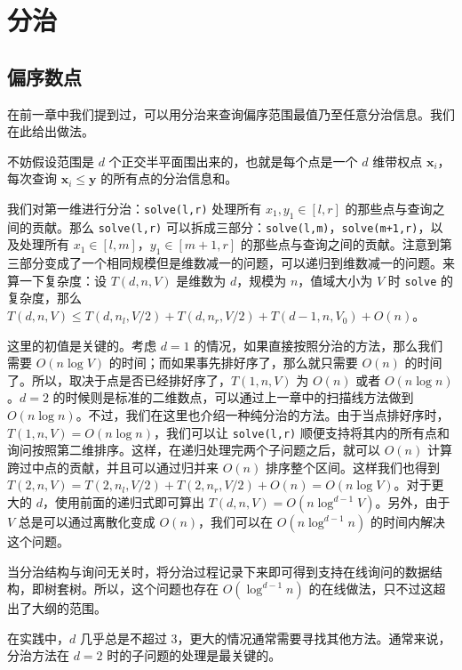 \chapter{分治}

\section{偏序数点}

在前一章中我们提到过，可以用分治来查询偏序范围最值乃至任意分治信息。我们在此给出做法。

不妨假设范围是 $d$ 个正交半平面围出来的，也就是每个点是一个 $d$ 维带权点 $\mathbf x_i$，每次查询 $\mathbf x_i\le \mathbf y$ 的所有点的分治信息和。

我们对第一维进行分治：\texttt{solve(l,r)} 处理所有 $x_1,y_1\in[l,r]$ 的那些点与查询之间的贡献。那么 \texttt{solve(l,r)} 可以拆成三部分：\texttt{solve(l,m)}，\texttt{solve(m+1,r)}，以及处理所有 $x_1\in [l,m]$，$y_1\in [m+1,r]$ 的那些点与查询之间的贡献。注意到第三部分变成了一个相同规模但是维数减一的问题，可以递归到维数减一的问题。来算一下复杂度：设 $T(d,n,V)$ 是维数为 $d$，规模为 $n$，值域大小为 $V$ 时 \texttt{solve} 的复杂度，那么 $T(d,n,V)\le T(d,n_l,V/2)+T(d,n_r,V/2)+T(d-1,n,V_0)+O(n)$。

这里的初值是关键的。考虑 $d=1$ 的情况，如果直接按照分治的方法，那么我们需要 $O(n\log V)$ 的时间；而如果事先排好序了，那么就只需要 $O(n)$ 的时间了。所以，取决于点是否已经排好序了，$T(1,n,V)$ 为 $O(n)$ 或者 $O(n\log n)$。$d=2$ 的时候则是标准的二维数点，可以通过上一章中的扫描线方法做到 $O(n\log n)$。不过，我们在这里也介绍一种纯分治的方法。由于当点排好序时，$T(1,n,V)=O(n\log n)$，我们可以让 \texttt{solve(l,r)} 顺便支持将其内的所有点和询问按照第二维排序。这样，在递归处理完两个子问题之后，就可以 $O(n)$ 计算跨过中点的贡献，并且可以通过归并来 $O(n)$ 排序整个区间。这样我们也得到 $T(2,n,V)=T(2,n_l,V/2)+T(2,n_r,V/2)+O(n)=O(n\log V)$。对于更大的 $d$，使用前面的递归式即可算出 $T(d,n,V)=O(n\log^{d-1}V)$。另外，由于 $V$ 总是可以通过离散化变成 $O(n)$，我们可以在 $O(n\log^{d-1}n)$ 的时间内解决这个问题。

\begin{remark}
    当分治结构与询问无关时，将分治过程记录下来即可得到支持在线询问的数据结构，即树套树。所以，这个问题也存在 $O(\log^{d-1}n)$ 的在线做法，只不过这超出了大纲的范围。
\end{remark}

在实践中，$d$ 几乎总是不超过 $3$，更大的情况通常需要寻找其他方法。通常来说，分治方法在 $d=2$ 时的子问题的处理是最关键的。

